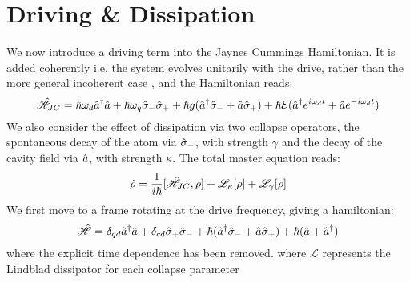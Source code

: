 
\section{Driving \& Dissipation}
We now introduce a driving term into the Jaynes Cummings Hamiltonian. It is added coherently i.e. the system evolves unitarily with the drive, rather than the more general incoherent case \cite{Xu2014}, and the Hamiltonian reads:
\begin{equation}
  \hat{\mathscr{H}}_{JC} = \hbar \omega_d \hat{a}^\dagger \hat{a} + \hbar \omega_q \hat{\sigma}_- \hat{\sigma}_+ +\hbar g (\hat{a}^\dagger \hat{\sigma}_-+ \hat{a} \hat{\sigma}_+) + \hbar \mathcal{E} (\hat{a}^\dagger e^{i\omega_d t} + \hat{a} e^{-i\omega_d t})
\end{equation}
We also consider the effect of dissipation via two collapse operators, the spontaneous decay of the atom via $\hat{\sigma}_-$, with strength $\gamma$ and the decay of the cavity field via $\hat{a}$, with strength $\kappa$. The total master equation reads:
\begin{equation}
  \dot{\rho} = \frac{1}{i\hbar}[\hat{\mathscr{H}}_{JC}, \rho] + \mathscr{L}_\kappa[\rho] + \mathscr{L}_\gamma[\rho]
\end{equation}
We first move to a frame rotating at the drive frequency, giving a hamiltonian:
\begin{equation}
  \hat{\mathscr{H}} = \delta_{qd} \hat{a}^\dagger \hat{a} + \delta_{cd} \hat{\sigma}_+ \hat{\sigma}_- + \hbar (\hat{a}^\dagger \hat{\sigma}_- + \hat{a} \hat{\sigma}_+) + \hbar (\hat{a} + \hat{a}^\dagger)
\end{equation}
where the explicit time dependence has been removed.
where $\mathscr{L}$ represents the Lindblad dissipator for each collapse parameter

